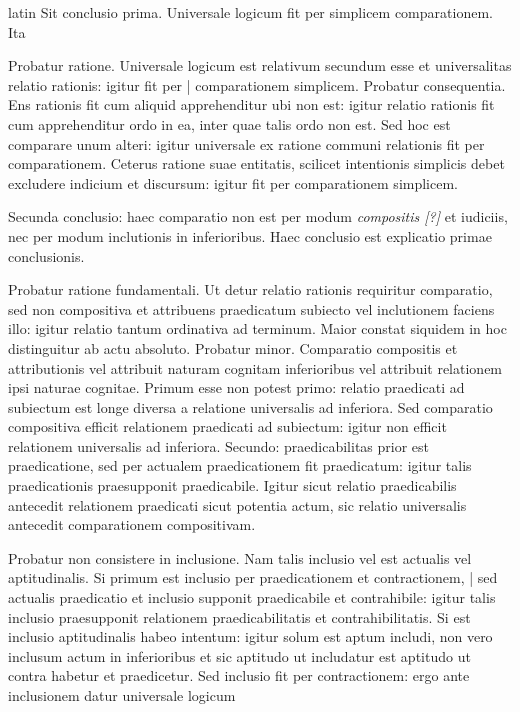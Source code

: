 \begin{otherlanguage*}{latin}
\pstart
Sit conclusio prima. Universale logicum fit per simplicem comparationem. Ita  
\pend

\pstart
Probatur ratione. Universale logicum est relativum secundum esse et universalitas relatio rationis:
igitur fit per \textnormal{|} comparationem simplicem. Probatur consequentia. Ens rationis fit cum aliquid apprehenditur ubi non est:
igitur relatio rationis fit cum apprehenditur ordo in ea, inter quae talis ordo non est. Sed hoc est comparare unum alteri:
igitur universale ex ratione communi relationis fit per comparationem. Ceterus ratione suae entitatis, scilicet intentionis simplicis debet excludere indicium et discursum:
igitur fit per comparationem simplicem. 
\pend

\pstart
Secunda conclusio:
haec comparatio non est per modum \emph{compositis [?]} et iudiciis, nec per modum inclutionis in inferioribus. Haec conclusio est explicatio primae conclusionis. 
\pend

\pstart
Probatur ratione fundamentali. Ut detur relatio rationis requiritur comparatio, sed non compositiva et attribuens praedicatum subiecto vel inclutionem faciens  illo:
igitur relatio tantum ordinativa ad terminum. Maior constat siquidem in hoc distinguitur ab actu absoluto. Probatur minor. Comparatio compositis et attributionis vel attribuit naturam cognitam inferioribus vel attribuit relationem ipsi naturae cognitae. Primum esse non potest primo:
relatio praedicati ad subiectum est longe diversa a relatione universalis ad inferiora. Sed comparatio compositiva efficit relationem praedicati ad subiectum:
igitur non efficit relationem universalis ad inferiora. Secundo:
praedicabilitas prior est praedicatione, sed per actualem praedicationem fit praedicatum:
igitur talis praedicationis praesupponit praedicabile. Igitur sicut relatio praedicabilis antecedit relationem praedicati sicut potentia actum, sic relatio universalis antecedit comparationem compositivam. 
\pend

\pstart
Probatur non consistere in inclusione. Nam talis inclusio vel est actualis vel aptitudinalis. Si primum est inclusio per praedicationem et contractionem, \textnormal{|} sed actualis praedicatio et inclusio supponit praedicabile et contrahibile:
igitur talis inclusio praesupponit relationem praedicabilitatis et contrahibilitatis. Si est inclusio aptitudinalis habeo intentum:
igitur solum est aptum includi, non vero inclusum actum in inferioribus et sic aptitudo ut includatur est aptitudo ut contra habetur et praedicetur. Sed inclusio fit per contractionem:
ergo ante inclusionem datur universale logicum 
\pend


\end{otherlanguage*}
